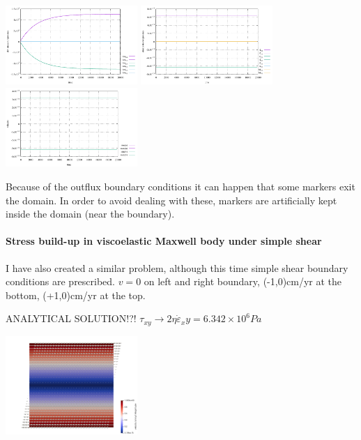 \includegraphics[width=5cm]{python_codes/fieldstone_64/results/buildup_11/tau}
\includegraphics[width=5cm]{python_codes/fieldstone_64/results/buildup_11/strainrate}
\includegraphics[width=5cm]{python_codes/fieldstone_64/results/buildup_11/velocity}\\

\begin{remark}
Because of the outflux boundary conditions it can happen that some markers 
exit the domain. In order to avoid dealing with these, markers are artificially 
kept inside the domain (near the boundary).
\end{remark}

\paragraph{Stress build-up in viscoelastic Maxwell body under simple shear}

I have also created a similar problem, although this time simple shear boundary conditions are prescribed.
$v=0$ on left and right boundary, (-1,0)cm/yr at the bottom, (+1,0)cm/yr at the top.

ANALYTICAL SOLUTION!?!
$\tau_{xy} \rightarrow 2 \eta \dot{\varepsilon}_xy = 6.342\times 10^{6} Pa$ 

\begin{center}
\includegraphics[width=5cm]{python_codes/fieldstone_64/results/buildup_12/vel}
\end{center}


